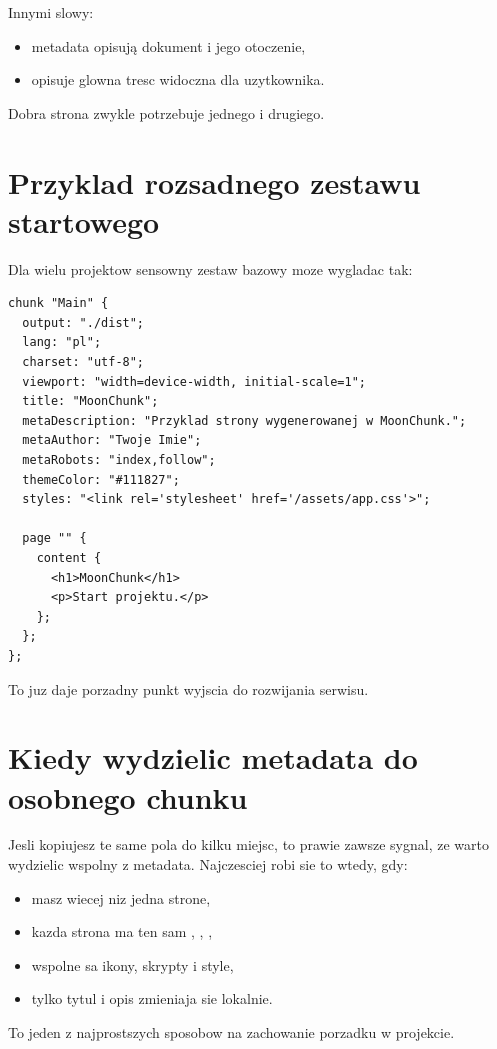 Innymi slowy:

\begin{itemize}
  \item metadata opisują dokument i jego otoczenie,
  \item {} opisuje glowna tresc widoczna dla uzytkownika.
\end{itemize}

Dobra strona zwykle potrzebuje jednego i drugiego.

\section{Przyklad rozsadnego zestawu startowego}
Dla wielu projektow sensowny zestaw bazowy moze wygladac tak:

\begin{lstlisting}[style=moonchunk,caption={Rozsadny zestaw metadata startowych}]
chunk "Main" {
  output: "./dist";
  lang: "pl";
  charset: "utf-8";
  viewport: "width=device-width, initial-scale=1";
  title: "MoonChunk";
  metaDescription: "Przyklad strony wygenerowanej w MoonChunk.";
  metaAuthor: "Twoje Imie";
  metaRobots: "index,follow";
  themeColor: "#111827";
  styles: "<link rel='stylesheet' href='/assets/app.css'>";

  page "" {
    content {
      <h1>MoonChunk</h1>
      <p>Start projektu.</p>
    };
  };
};
\end{lstlisting}

To juz daje porzadny punkt wyjscia do rozwijania serwisu.

\section{Kiedy wydzielic metadata do osobnego chunku}
Jesli kopiujesz te same pola do kilku miejsc, to prawie zawsze sygnal, ze warto
wydzielic wspolny  z metadata. Najczesciej robi sie to wtedy, gdy:

\begin{itemize}
  \item masz wiecej niz jedna strone,
  \item kazda strona ma ten sam , , ,
  \item wspolne sa ikony, skrypty i style,
  \item tylko tytul i opis zmieniaja sie lokalnie.
\end{itemize}

To jeden z najprostszych sposobow na zachowanie porzadku w projekcie.

